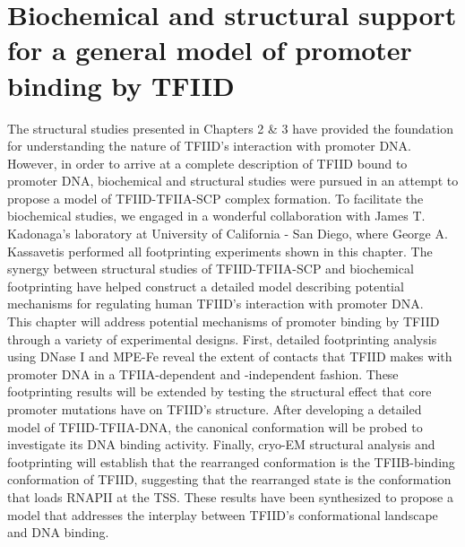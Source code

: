 \chapter{Biochemical and structural support for a general model of promoter binding by TFIID}

The structural studies presented in Chapters 2 \& 3 have provided the foundation for understanding the nature of TFIID's interaction with promoter DNA. However, in order to arrive at a complete description of TFIID bound to promoter DNA, biochemical and structural studies were pursued in an attempt to propose a model of TFIID-TFIIA-SCP complex formation. To facilitate the biochemical studies, we engaged in a wonderful collaboration with James T. Kadonaga's laboratory at University of California - San Diego, where George A. Kassavetis performed all footprinting experiments shown in this chapter. The synergy between structural studies of TFIID-TFIIA-SCP and biochemical footprinting have helped construct a detailed model describing potential mechanisms for regulating human TFIID's interaction with promoter DNA.\\
\indent This chapter will address potential mechanisms of promoter binding by TFIID through a variety of experimental designs. First, detailed footprinting analysis using DNase I and MPE-Fe reveal the extent of contacts that TFIID makes with promoter DNA in a TFIIA-dependent and -independent fashion. These footprinting results will be extended by testing the structural effect that core promoter mutations have on TFIID's structure. After developing a detailed model of TFIID-TFIIA-DNA, the canonical conformation will be probed to investigate its DNA binding activity. Finally, cryo-EM structural analysis and footprinting will establish that the rearranged conformation is the TFIIB-binding conformation of TFIID, suggesting that the rearranged state is the conformation that loads RNAPII at the TSS. These results have been synthesized to propose a model that addresses the interplay between TFIID's conformational landscape and DNA binding.\\
  
